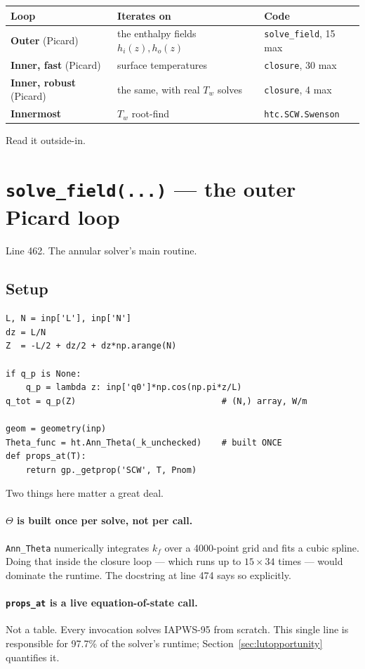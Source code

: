 \documentclass[11pt]{article}
\newcommand{\code}[1]{\texttt{#1}}
\begin{document}
\begin{center}
\begin{tabular}{lll}
\toprule
Loop & Iterates on & Code \\
\midrule
\textbf{Outer} (Picard) & the enthalpy fields $h_i(z), h_o(z)$ & \code{solve\_field}, 15 max \\
\quad \textbf{Inner, fast} (Picard) & surface temperatures & \code{closure}, 30 max \\
\quad \textbf{Inner, robust} (Picard) & the same, with real $T_w$ solves & \code{closure}, 4 max \\
\qquad \textbf{Innermost} & $T_w$ root-find & \code{htc.SCW.Swenson} \\
\bottomrule
\end{tabular}
\end{center}

Read it outside-in.

\section{\code{solve\_field(...)} --- the outer Picard loop}
Line 462. The annular solver's main routine.

\subsection{Setup}
\begin{lstlisting}
L, N = inp['L'], inp['N']
dz = L/N
Z  = -L/2 + dz/2 + dz*np.arange(N)

if q_p is None:
    q_p = lambda z: inp['q0']*np.cos(np.pi*z/L)
q_tot = q_p(Z)                             # (N,) array, W/m

geom = geometry(inp)
Theta_func = ht.Ann_Theta(_k_unchecked)    # built ONCE
def props_at(T):
    return gp._getprop('SCW', T, Pnom)
\end{lstlisting}

Two things here matter a great deal.

\paragraph{$\Theta$ is built once per solve, not per call.} \code{Ann\_Theta} numerically
integrates $k_f$ over a 4000-point grid and fits a cubic spline. Doing that inside the
closure loop --- which runs up to $15 \times 34$ times --- would dominate the runtime. The
docstring at line 474 says so explicitly.

\paragraph{\code{props\_at} is a live equation-of-state call.} Not a table. Every
invocation solves IAPWS-95 from scratch. This single line is responsible for 97.7\% of
the solver's runtime; Section~\ref{sec:lutopportunity} quantifies it.
\end{document}
